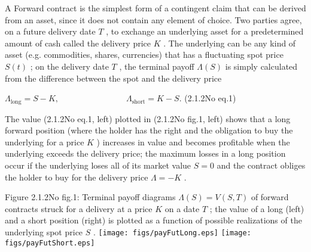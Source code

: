 \documentclass{beamer}
\begin{document}
	\begin{frame}
		
	\end{frame}
	\begin{frame}
		A Forward contract is the simplest form of a contingent claim that can be derived from an asset, since it does not contain any element of choice. Two parties agree, on a future delivery date $ T$ , to exchange an underlying asset for a predetermined amount of cash called the delivery price $ K$ . The underlying can be any kind of asset (e.g. commodities, shares, currencies) that has a fluctuating spot price $ S(t)$ ; on the delivery date $ T$ , the terminal payoff $ \Lambda (S)$ is simply calculated from the difference between the spot and the delivery price
		
		$\displaystyle \Lambda_\mathrm{long}=S-K, \qquad\qquad\qquad\qquad \Lambda_\mathrm{short}=K-S.$	 (2.1.2No eq.1)
		
	\end{frame}
	\begin{frame}
		The value (2.1.2No eq.1, left) plotted in (2.1.2No fig.1, left) shows that a long forward position (where the holder has the right and the obligation to buy the underlying for a price $ K$ ) increases in value and becomes profitable when the underlying exceeds the delivery price; the maximum losses in a long position occur if the underlying loses all of its market value $ S=0$ and the contract obliges the holder to buy for the delivery price  $ \Lambda=-K$ .
	\end{frame}
	\begin{frame}
		Figure 2.1.2No fig.1: Terminal payoff diagrams  $ \Lambda (S)=V(S,T)$ of forward contracts struck for a delivery at a price $ K$ on a date $ T$ ; the value of a long (left) and a short position (right) is plotted as a function of possible realizations of the underlying spot price $ S$ .
		\texttt{[image: figs/payFutLong.eps]}        \texttt{[image: figs/payFutShort.eps]}
	\end{frame}
\end{document}
